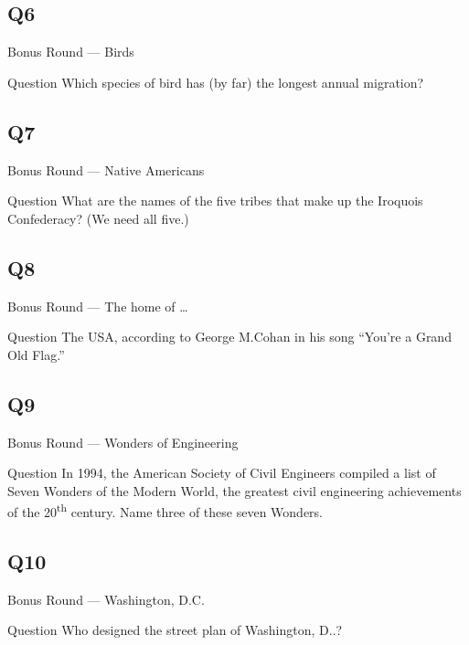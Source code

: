 \documentclass[11pt]{beamer}
\begin{document}
\subsection*{Q6}
\begin{frame}[t]{Bonus Round --- Birds}
\vspace{-0.5em}
\begin{block}{Question}
Which species of bird has (by far) the longest annual migration?
\end{block}
\end{frame}
\subsection*{Q7}
\begin{frame}[t]{Bonus Round --- Native Americans}
\vspace{-0.5em}
\begin{block}{Question}
What are the names of the five tribes that make up the Iroquois Confederacy?  (We need all five.)
\end{block}
\end{frame}
\subsection*{Q8}
\begin{frame}[t]{Bonus Round --- The home of \ldots{}}
\vspace{-0.5em}
\begin{block}{Question}
The USA, according to George M.\@ Cohan in his song ``You're a Grand Old Flag.''
\end{block}
\end{frame}
\subsection*{Q9}
\begin{frame}[t]{Bonus Round --- Wonders of Engineering}
\vspace{-0.5em}
\begin{block}{Question}
In 1994, the American Society of Civil Engineers compiled a list of Seven Wonders of the Modern World, the greatest civil engineering achievements of the 20\textsuperscript{th} century. Name three of these seven Wonders.
\end{block}
\end{frame}
\subsection*{Q10}
\begin{frame}[t]{Bonus Round --- Washington, D.C.}
\vspace{-0.5em}
\begin{block}{Question}
Who designed the street plan of Washington, D.\@C.\@?
\end{block}
\end{frame}
\end{document}
